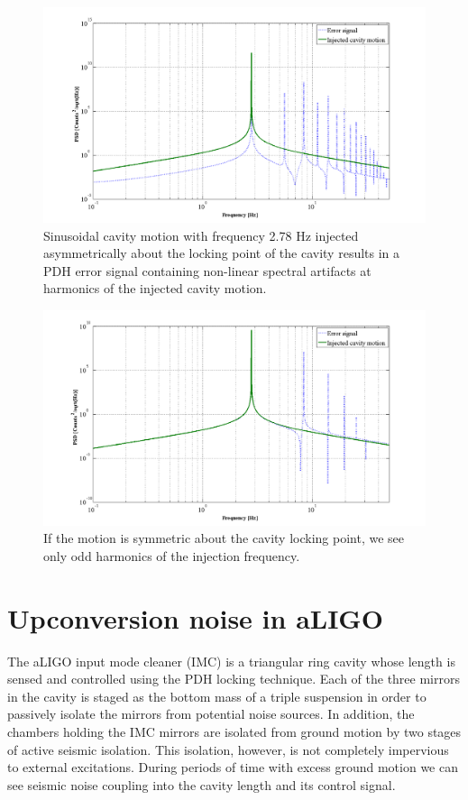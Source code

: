 \begin{figure}[h!]
\includegraphics[height=0.6\textwidth]{figures/IMCUpconversion/PDH_error_signal_harmonics.png}
\caption[PDH response to asymmetric cavity motion]{Sinusoidal cavity motion with frequency 2.78 Hz injected asymmetrically about the locking point of the cavity results in a PDH error signal containing non-linear spectral artifacts at harmonics of the injected cavity motion.}
\end{figure}

\begin{figure}[h!]
\caption[PDH response to symmetric cavity motion]{If the motion is symmetric about the cavity locking point, we see only odd harmonics of the injection frequency.}
\includegraphics[height=0.6\textwidth]{figures/IMCUpconversion/symmetric_PDH.png}
\end{figure}

\section{Upconversion noise in aLIGO}
The aLIGO input mode cleaner (IMC) is a triangular ring cavity whose length is sensed and controlled using the PDH locking technique. Each of the three mirrors in the cavity is staged as the bottom mass of a triple suspension in order to passively isolate the mirrors from  potential noise sources. In addition, the chambers holding the IMC mirrors are isolated from ground motion by two stages of active seismic isolation. This isolation, however, is not completely impervious to external excitations. During periods of time with excess ground motion we can see seismic noise coupling into the cavity length and its control signal.

